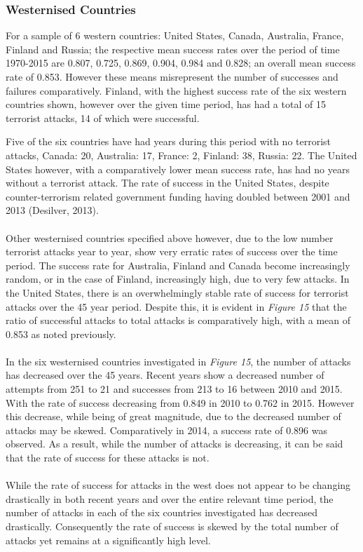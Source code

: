 \documentclass[10pt,a4paper]{article}
\begin{document}
\subsubsection{Westernised Countries}
For a sample of 6 western countries: United States, Canada, Australia, France, Finland and Russia; the respective mean success rates over the period of time 1970-2015 are 0.807, 0.725, 0.869, 0.904, 0.984 and 0.828; an overall mean success rate of 0.853. However these means misrepresent the number of successes and failures comparatively. Finland, with the highest success rate of the six western countries shown, however over the given time period, has had a total of 15 terrorist attacks, 14 of which were successful. 

Five of the six countries have had years during this period with no terrorist attacks, Canada: 20, Australia: 17, France: 2, Finland: 38, Russia: 22. The United States however, with a comparatively lower mean success rate, has had no years without a terrorist attack. The rate of success in the United States, despite counter-terrorism related government funding having doubled between 2001 and 2013 (Desilver, 2013).
\\\\
Other westernised countries specified above however, due to the low number terrorist attacks year to year, show very erratic rates of success over the time period. The success rate for Australia, Finland and Canada become increasingly random, or in the case of Finland, increasingly high, due to very few attacks. In the United States, there is an overwhelmingly stable rate of success for terrorist attacks over the 45 year period. Despite this, it is evident in \textit{Figure 15} that the ratio of successful attacks to total attacks is comparatively high, with a mean of 0.853 as noted previously.
\\\\
In the six westernised countries investigated in \textit{Figure 15}, the number of attacks has decreased over the 45 years. Recent years show a decreased number of attempts from 251 to 21 and successes from 213 to 16 between 2010 and 2015. With the rate of success decreasing from 0.849 in 2010 to 0.762 in 2015. However this decrease, while being of great magnitude, due to the decreased number of attacks may be skewed. Comparatively in 2014, a success rate of 0.896 was observed. As a result, while the number of attacks is decreasing, it can be said that the rate of success for these attacks is not.
\\\\
While the rate of success for attacks in the west does not appear to be changing drastically in both recent years and over the entire relevant time period, the number of attacks in each of the six countries investigated has decreased drastically. Consequently the rate of success is skewed by the total number of attacks yet remains at a significantly high level.
\end{document}
